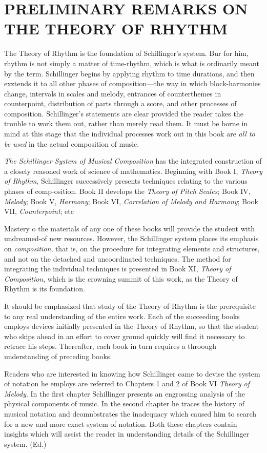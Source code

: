 
\chapter{PRELIMINARY REMARKS ON THE THEORY OF RHYTHM}

The Theory of Rhythm is the foundation of Schillinger's system. Bur for him, rhythm is not simply a matter of time-rhythm, which is what is ordinarily meant by the term. Schillinger begins by applying rhythm to time durations, and then exztends it to all other phases of composition---the way in which block-harmonies change, intervals in scales and melody, entrances of counterthemes in counterpoint, distribution of parts through a score, and other processes of composition. Schillinger's statements are clear provided the reader takes the trouble to work them out, rather than merely read them. It must be borne in mind at this stage that the individual processes work out in this book are \textit{all to be used} in the actual composition of music.

\textit{The Schillinger System of Musical Composition} has the integrated construction of a closely reasoned work of science of mathematics. Beginning with Book I, \textit{Theory of Rhythm}, Schillinger successively presents techniques relating to the various phases of comp-osition. Book II develops the \textit{Theory of Pitch Scales}; Book IV, \textit{Melody}; Book V, \textit{Harmony}; Book VI, \textit{Correlation of Melody and Harmony}; Book VII, \textit{Counterpoint}; etc

Mastery o the materials of any one of these books will provide the student with undreamed-of new resources. However, the Schillinger system places its emphasis on \textit{composition}, that is, on the procedure for integrating elements and structures, and not on the detached and uncoordinated techniques. The method for integrating the individual techniques is presented in Book XI, \textit{Theory of Composition}, which is the crowning summit of this work, as the Theory of Rhythm is its foundation.

It should be emphasized that study of the Theory of Rhythm is the prerequisite to any real understanding of the entire work. Each of the succeeding books employs devices initially presented in the Theory of Rhythm, so that the student who skips ahead in an effort to cover ground quickly will find it necessary to retrace his steps. Thereafter, each book in turn requires a throough understanding of preceding books.

Readers who are interested in knowing how Schillinger came to devise the system of notation he employs are referred to Chapters 1 and 2 of Book VI \textit{Theory of Melody}. In the first chapter Schillinger presents an engrossing analysis of the physical components of music. In the second chapter he traces the history of musical notation and deomnbstrates the inadequacy which caused him to search for a new and more exact system of notation. Both these chapters contain insights which will assist the reader in understanding details of the Schillinger system. \hspace{1pt} (Ed.)
